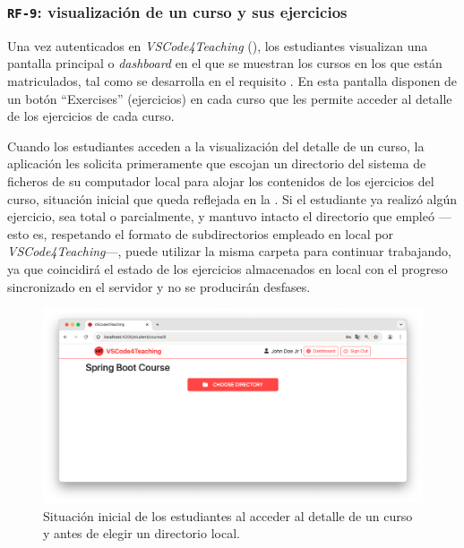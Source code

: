 \subsubsection{\texttt{RF-9}: visualización de un curso y sus ejercicios}
\label{subsec:rf9}

Una vez autenticados en \textit{VSCode4Teaching} (), los estudiantes visualizan una pantalla principal o \textit{dashboard} en el que se muestran los cursos en los que están matriculados, tal como se desarrolla en el requisito . En esta pantalla disponen de un botón ``Exercises'' (ejercicios) en cada curso que les permite acceder al detalle de los ejercicios de cada curso.

Cuando los estudiantes acceden a la visualización del detalle de un curso, la aplicación les solicita primeramente que escojan un directorio del sistema de ficheros de su computador local para alojar los contenidos de los ejercicios del curso, situación inicial que queda reflejada en la . Si el estudiante ya realizó algún ejercicio, sea total o parcialmente, y mantuvo intacto el directorio que empleó ---esto es, respetando el formato de subdirectorios empleado en local por \textit{VSCode4Teaching}---, puede utilizar la misma carpeta para continuar trabajando, ya que coincidirá el estado de los ejercicios almacenados en local con el progreso sincronizado en el servidor y no se producirán desfases.

\begin{figure}[ht]
    \centering
    \includegraphics[width=\textwidth]{imagenes/utilizadas/4-3-implementacion/rf9-1.png}
    \caption{Situación inicial de los estudiantes al acceder al detalle de un curso y antes de elegir un directorio local.}
    \label{fig:reqf9-1}
\end{figure}


